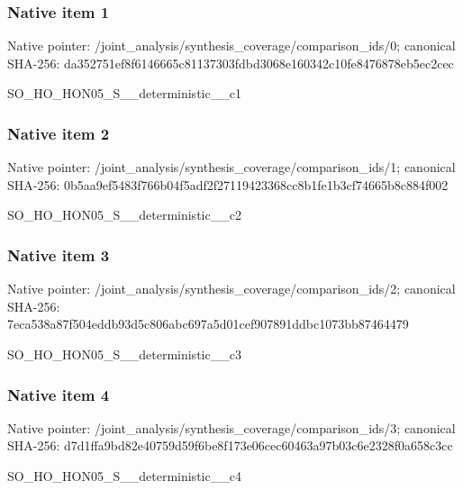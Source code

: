 \documentclass[10pt,a4paper]{article}
\begin{document}
\subsubsection{Native item 1}
Native pointer: /joint\_\allowbreak{}analysis/synthesis\_\allowbreak{}coverage/comparison\_\allowbreak{}ids/0; canonical SHA-256: da352751ef8f6146665c81137303fdbd3068e160342c10fe8476878eb5ec2cec

\begingroup\raggedright\sloppy SO\_\allowbreak{}HO\_\allowbreak{}HON05\_\allowbreak{}S\_\allowbreak{}\_\allowbreak{}deterministic\_\allowbreak{}\_\allowbreak{}c1\par\endgroup

\subsubsection{Native item 2}
Native pointer: /joint\_\allowbreak{}analysis/synthesis\_\allowbreak{}coverage/comparison\_\allowbreak{}ids/1; canonical SHA-256: 0b5aa9ef5483f766b04f5adf2f27119423368cc8b1fe1b3cf74665b8c884f002

\begingroup\raggedright\sloppy SO\_\allowbreak{}HO\_\allowbreak{}HON05\_\allowbreak{}S\_\allowbreak{}\_\allowbreak{}deterministic\_\allowbreak{}\_\allowbreak{}c2\par\endgroup

\subsubsection{Native item 3}
Native pointer: /joint\_\allowbreak{}analysis/synthesis\_\allowbreak{}coverage/comparison\_\allowbreak{}ids/2; canonical SHA-256: 7eca538a87f504eddb93d5c806abc697a5d01cef907891ddbc1073bb87464479

\begingroup\raggedright\sloppy SO\_\allowbreak{}HO\_\allowbreak{}HON05\_\allowbreak{}S\_\allowbreak{}\_\allowbreak{}deterministic\_\allowbreak{}\_\allowbreak{}c3\par\endgroup

\subsubsection{Native item 4}
Native pointer: /joint\_\allowbreak{}analysis/synthesis\_\allowbreak{}coverage/comparison\_\allowbreak{}ids/3; canonical SHA-256: d7d1ffa9bd82e40759d59f6be8f173e06cec60463a97b03c6e2328f0a658c3cc

\begingroup\raggedright\sloppy SO\_\allowbreak{}HO\_\allowbreak{}HON05\_\allowbreak{}S\_\allowbreak{}\_\allowbreak{}deterministic\_\allowbreak{}\_\allowbreak{}c4\par\endgroup
\end{document}
